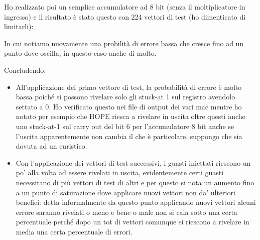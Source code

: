 \documentclass[12pt, letterpaper]{article}
\begin{document}
Ho realizzato poi un semplice accumulatore ad 8 bit (senza il moltiplicatore in ingresso) e il risultato è stato questo con 224 vettori di test (ho dimenticato di limitarli):



In cui notiamo nuovamente una probilità di errore bassa che cresce fino ad un punto dove oscilla, in questo caso anche di molto.

Concludendo:

\begin{itemize}
\item All'applicazione del primo vettore di test, la probabilità di errore è molto bassa poiché si possono rivelare solo gli stuck-at 1 sul registro avendolo settato a 0. Ho verificato questo nei file di output dei vari mac mentre ho notato per esempio che HOPE riesca a rivelare in uscita oltre questi anche uno stuck-at-1 sul carry out del bit 6 per l'accumulatore 8 bit anche se l'uscita apparentemente non cambia il che è particolare, suppongo che sia dovuta ad un euristico.
\item Con l'applicazione dei vettori di test successivi, i guasti iniettati riescono un po' alla volta ad essere rivelati in uscita, evidentemente certi guasti necessitano di più vettori di test di altri e per questo si nota un aumento fino a un punto di saturazione dove applicare nuovi vettori non da' ulteriori benefici: detta informalmente da questo punto applicando nuovi vettori alcuni errore saranno rivelati o meno e bene o male non si cala sotto una certa percentuale perché dopo un tot di vettori comunque si riescono a rivelare in media una certa percentuale di errori.

\end{itemize}
\end{document}

